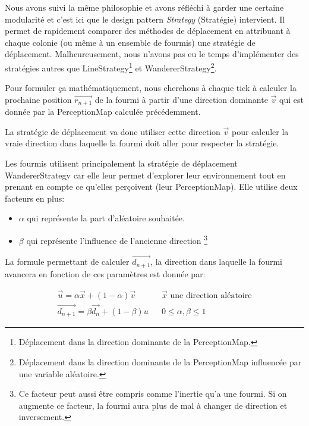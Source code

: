 \documentclass{EPUProjetDi}
\begin{document}
Nous avons suivi la même philosophie et avons réfléchi à garder une certaine modularité et c'est ici que le design pattern 
\textit{Strategy} (Stratégie) intervient. Il permet de rapidement comparer des méthodes de déplacement en attribuant à chaque colonie 
(ou même à un ensemble de fourmis) une stratégie de déplacement.
Malheureusement, nous n'avons pas eu le temps d'implémenter des stratégies autres que LineStrategy\footnote{Déplacement dans la direction dominante de la PerceptionMap.} 
et WandererStrategy\footnote{Déplacement dans la direction dominante de la PerceptionMap influencée par une variable aléatoire.}.

Pour formuler ça mathématiquement, nous cherchons à chaque tick à calculer la prochaine position $\vec{r_{n+1}}$ de la fourmi à partir
d'une direction dominante $\vec{v}$ qui est donnée par la PerceptionMap calculée précédemment.

La stratégie de déplacement va donc utiliser cette direction $\vec{v}$ pour calculer la vraie direction dans laquelle la fourmi doit aller 
pour respecter la stratégie.

Les fourmis utilisent principalement la stratégie de déplacement WandererStrategy car elle leur permet d'explorer leur environnement tout en prenant
en compte ce qu'elles perçoivent (leur PerceptionMap). Elle utilise deux facteurs en plus: 
\begin{itemize}
    \item $\alpha$ qui représente la part d'aléatoire souhaitée.
    \item $\beta$ qui représente l'influence de l'ancienne direction \footnote{Ce facteur peut aussi être compris comme l'inertie qu'a une fourmi.
    Si on augmente ce facteur, la fourmi aura plus de mal à changer de direction et inversement.}
\end{itemize}

La formule permettant de calculer $\vec{d_{n+1}}$, la direction dans laquelle la fourmi avancera en fonction de ces paramètres est donnée par:

\begin{subequations}
    \begin{align}
        \vec{u}=\alpha \vec{x} + (1 - \alpha) \vec{v} && \text{$\vec{x}$ une direction aléatoire} \\
        \tag{1.4}\vec{d_{n+1}}=\beta \vec{d_{n}} + (1-\beta)u &&  0\leqslant \alpha,\beta \leqslant 1
    \end{align}
\end{subequations}
\end{document}
